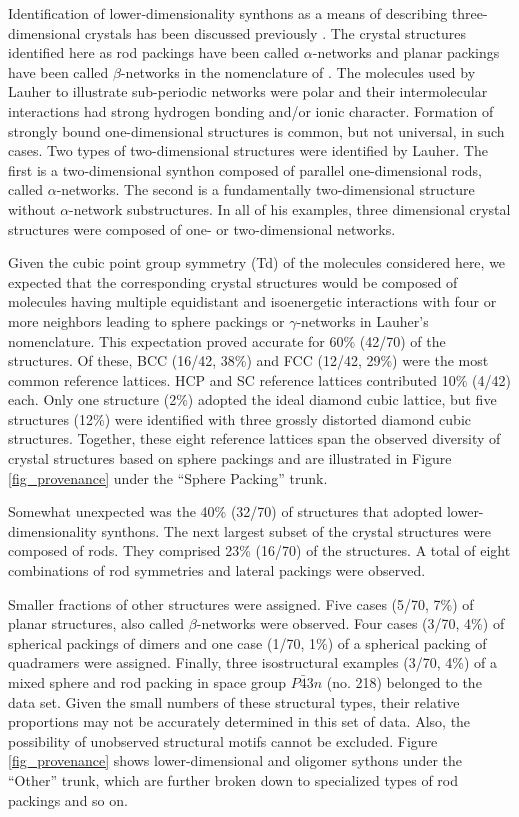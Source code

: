 \documentclass[preprint]{iucr}              %
\begin{document}
Identification of lower-dimensionality synthons as a means of describing three-dimensional crystals has been discussed previously \cite{Lauher04}.  The crystal structures identified here as rod packings have been called $\alpha$-networks and planar packings have been called $\beta$-networks in the nomenclature of \cite{Lauher04}.  The molecules used by Lauher to illustrate sub-periodic networks were polar and their intermolecular interactions had strong hydrogen bonding and/or ionic character.  Formation of strongly bound one-dimensional structures is common, but not universal, in such cases.  Two types of two-dimensional structures were identified by Lauher.  The first is a two-dimensional synthon composed of parallel one-dimensional rods, called $\alpha$-networks.   The second is a fundamentally two-dimensional structure without $\alpha$-network substructures.  In all of his examples, three dimensional crystal structures were composed of one- or two-dimensional networks.

Given the cubic point group symmetry (Td) of the molecules considered here, we expected that the corresponding crystal structures would be composed of molecules having multiple equidistant and isoenergetic interactions with four or more neighbors leading to sphere packings or $\gamma$-networks in Lauher's nomenclature.  This expectation proved accurate for 60\% (42/70) of the structures.  Of these, BCC (16/42, 38\%) and FCC (12/42, 29\%) were the most common reference lattices.  HCP and SC reference lattices contributed 10\% (4/42) each.  Only one structure (2\%) adopted the ideal diamond cubic lattice, but five structures (12\%) were identified with three grossly distorted diamond cubic structures.  Together, these eight reference lattices span the observed diversity of crystal structures based on sphere packings and are illustrated in Figure \ref{fig_provenance} under the ``Sphere Packing'' trunk.

Somewhat unexpected was the 40\% (32/70) of structures that adopted lower-dimensionality synthons.  The next largest subset of the crystal structures were composed of rods.  They comprised 23\% (16/70) of the structures.  A total of eight combinations of rod symmetries and lateral packings were observed.

Smaller fractions of other structures were assigned.  Five cases (5/70, 7\%) of planar structures, also called $\beta$-networks were observed.  Four cases (3/70, 4\%) of spherical packings of dimers and one case (1/70, 1\%) of a spherical packing of quadramers were assigned.  Finally, three isostructural examples (3/70, 4\%) of a mixed sphere and rod packing in space group $P\bar{4}3n$ (no. 218) belonged to the data set.  Given the small numbers of these structural types, their relative proportions may not be accurately determined in this set of data.  Also, the possibility of unobserved structural motifs cannot be excluded.  Figure \ref{fig_provenance} shows lower-dimensional and oligomer sythons under the ``Other'' trunk, which are further broken down to specialized types of rod packings and so on.
\end{document}
